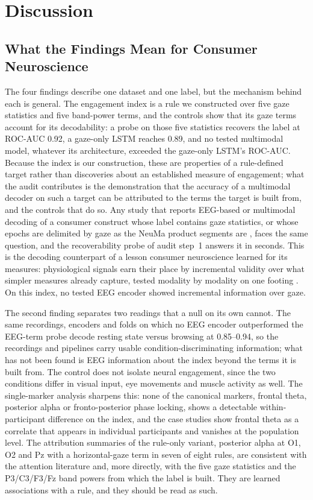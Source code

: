 \section{Discussion}\label{sec:discussion}

\subsection{What the Findings Mean for Consumer Neuroscience}\label{disc:meaning}

The four findings describe one dataset and one label, but the mechanism behind each is general. The engagement index is a rule we constructed over five gaze statistics and five band-power terms, and the controls show that its gaze terms account for its decodability: a probe on those five statistics recovers the label at ROC-AUC 0.92, a gaze-only LSTM reaches 0.89, and no tested multimodal model, whatever its architecture, exceeded the gaze-only LSTM's ROC-AUC. Because the index is our construction, these are properties of a rule-defined target rather than discoveries about an established measure of engagement; what the audit contributes is the demonstration that the accuracy of a multimodal decoder on such a target can be attributed to the terms the target is built from, and the controls that do so. Any study that reports EEG-based or multimodal decoding of a consumer construct whose label contains gaze statistics, or whose epochs are delimited by gaze as the NeuMa product segments are \cite{ref35}, faces the same question, and the recoverability probe of audit step~1 answers it in seconds. This is the decoding counterpart of a lesson consumer neuroscience learned for its measures: physiological signals earn their place by incremental validity over what simpler measures already capture, tested modality by modality on one footing \cite{ref65}. On this index, no tested EEG encoder showed incremental information over gaze.

The second finding separates two readings that a null on its own cannot. The same recordings, encoders and folds on which no EEG encoder outperformed the EEG-term probe decode resting state versus browsing at 0.85--0.94, so the recordings and pipelines carry usable condition-discriminating information; what has not been found is EEG information about the index beyond the terms it is built from. The control does not isolate neural engagement, since the two conditions differ in visual input, eye movements and muscle activity as well. The single-marker analysis sharpens this: none of the canonical markers, frontal theta, posterior alpha or fronto-posterior phase locking, shows a detectable within-participant difference on the index, and the case studies show frontal theta as a correlate that appears in individual participants and vanishes at the population level. The attribution summaries of the rule-only variant, posterior alpha at O1, O2 and Pz with a horizontal-gaze term in seven of eight rules, are consistent with the attention literature \cite{ref1,ref8} and, more directly, with the five gaze statistics and the P3/C3/F3/Fz band powers from which the label is built. They are learned associations with a rule, and they should be read as such.

